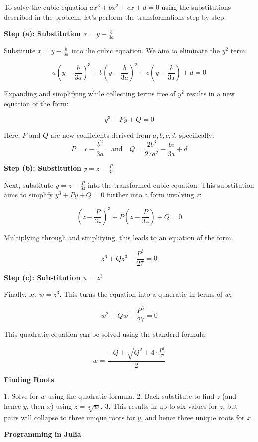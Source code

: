 \documentclass{article}
\begin{document}
To solve the cubic equation \(ax^3 + bx^2 + cx + d = 0\) using the substitutions described in the problem, let's perform the transformations step by step.

\textbf{Step (a): Substitution \(x = y - \frac{b}{3a}\)}

Substitute \(x = y - \frac{b}{3a}\) into the cubic equation. We aim to eliminate the \(y^2\) term:

\[
a\left(y - \frac{b}{3a}\right)^3 + b\left(y - \frac{b}{3a}\right)^2 + c\left(y - \frac{b}{3a}\right) + d = 0
\]

Expanding and simplifying while collecting terms free of \(y^2\) results in a new equation of the form:

\[
y^3 + Py + Q = 0
\]

Here, \(P\) and \(Q\) are new coefficients derived from \(a, b, c, d\), specifically:
\[
P = c - \frac{b^2}{3a} \quad \text{and} \quad Q = \frac{2b^3}{27a^2} - \frac{bc}{3a} + d
\]

\textbf{Step (b): Substitution \(y = z - \frac{P}{3z}\)}

Next, substitute \(y = z - \frac{P}{3z}\) into the transformed cubic equation. This substitution aims to simplify \(y^3 + Py + Q = 0\) further into a form involving \(z\):

\[
\left(z - \frac{P}{3z}\right)^3 + P\left(z - \frac{P}{3z}\right) + Q = 0
\]

Multiplying through and simplifying, this leads to an equation of the form:

\[
z^6 + Qz^3 - \frac{P^3}{27} = 0
\]

\textbf{Step (c): Substitution \(w = z^3\)}

Finally, let \(w = z^3\). This turns the equation into a quadratic in terms of \(w\):

\[
w^2 + Qw - \frac{P^3}{27} = 0
\]

This quadratic equation can be solved using the standard formula:

\[
w = \frac{-Q \pm \sqrt{Q^2 + 4 \cdot \frac{P^3}{27}}}{2}
\]

\textbf{Finding Roots}

1. Solve for \(w\) using the quadratic formula.
2. Back-substitute to find \(z\) (and hence \(y\), then \(x\)) using \(z = \sqrt[3]{w}\).
3. This results in up to six values for \(z\), but pairs will collapse to three unique roots for \(y\), and hence three unique roots for \(x\).

\textbf{Programming in Julia}
\end{document}
